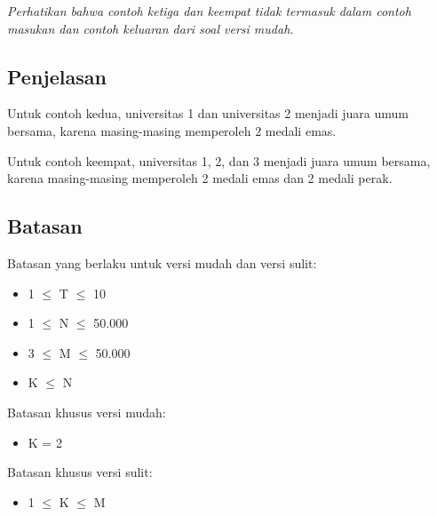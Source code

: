 \documentclass[../main_problemset.tex]{subfiles} %
\begin{document}
\textit{Perhatikan bahwa contoh ketiga dan keempat tidak termasuk dalam contoh masukan dan contoh keluaran dari soal versi mudah.}

\subsection*{Penjelasan}

Untuk contoh kedua, universitas 1 dan universitas 2 menjadi juara umum bersama, karena masing-masing memperoleh 2 medali emas.

Untuk contoh keempat, universitas 1, 2, dan 3 menjadi juara umum bersama, karena masing-masing memperoleh 2 medali emas dan 2 medali perak.

\subsection*{Batasan}

\begin{minipage}[t]{0.47\textwidth}

Batasan yang berlaku untuk versi mudah dan versi sulit:

\begin{itemize}
	\item 1 $ \leq $ T $ \leq $ 10
	\item 1 $ \leq $ N $ \leq $ 50.000
	\item 3 $ \le $ M $ \le $ 50.000
	\item K $ \le $ N
\end{itemize}
\end{minipage}
\begin{minipage}[t]{0.06\textwidth}
	\hfill
\end{minipage}
\begin{minipage}[t]{0.47\textwidth}
Batasan khusus versi mudah:
\begin{itemize}
	\item K = 2
\end{itemize}

\vspace{.2cm}

Batasan khusus versi sulit:
\begin{itemize}
	\item 1 $ \le $ K $ \le $ M
\end{itemize}
\end{minipage}
\end{document}
